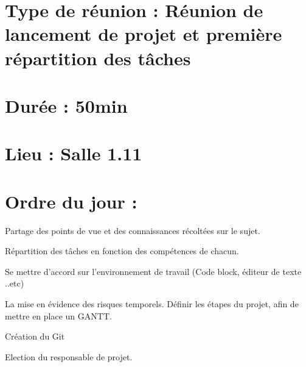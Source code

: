 \documentclass[11pt]{meetingmins}
\begin{document}
    \maketitle
    \section{Type de réunion : \textnormal{Réunion de lancement de projet et première répartition des tâches} }
    
    \section{Durée : \textnormal{50min} }
    \section{Lieu : \textnormal{ Salle 1.11} }
    
    
    \section{}
    \section{Ordre du jour :}
    \begin{hiddenitems}
    \item
    Partage des points de vue et des connaissances récoltées sur le sujet.
    \item
    Répartition des tâches en fonction des compétences de chacun.
    \item
    Se mettre d'accord sur l'environnement de travail (Code block, éditeur de texte ..etc)
    \item
    La mise en évidence des risques temporels. Définir les étapes du projet, afin de mettre en place un GANTT.
    \item
    Création du Git
    \item
    Election du responsable de projet.
    \end{hiddenitems}
    
\end{document}
